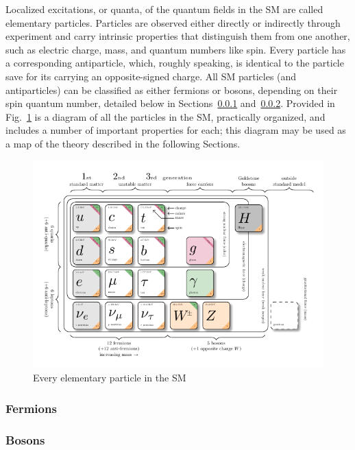 Localized excitations, or quanta, of the quantum fields in the SM are called elementary particles. Particles are observed either directly or indirectly through experiment and carry intrinsic properties that distinguish them from one another, such as electric charge, mass, and quantum numbers like spin. Every particle has a corresponding antiparticle, which, roughly speaking, is identical to the particle save for its carrying an opposite-signed charge. All SM particles (and antiparticles) can be classified as either fermions or bosons, depending on their spin quantum number, detailed below in Sections~\ref{sec:Fermions} and~\ref{sec:Bosons}. Provided in Fig.~\ref{fig:SM} is a diagram of all the particles in the SM, practically organized, and includes a number of important properties for each; this diagram may be used as a map of the theory described in the following Sections.

\begin{figure}[H]
    \centering
    \includegraphics[width=1\textwidth]{Images/model-physics.pdf}
    \caption{Every elementary particle in the SM}
    \label{fig:SM}
\end{figure}

\subsubsection{Fermions} \label{sec:Fermions}


\subsubsection{Bosons} \label{sec:Bosons}
